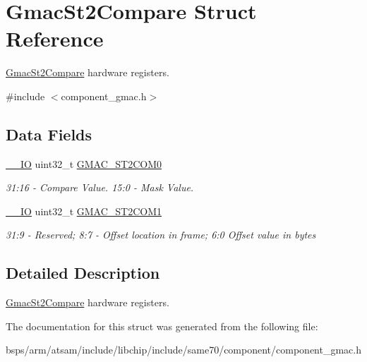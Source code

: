 \hypertarget{structGmacSt2Compare}{}\section{Gmac\+St2\+Compare Struct Reference}
\label{structGmacSt2Compare}


\mbox{\hyperlink{structGmacSt2Compare}{Gmac\+St2\+Compare}} hardware registers.  




{\ttfamily \#include $<$component\+\_\+gmac.\+h$>$}

\subsection*{Data Fields}
\begin{DoxyCompactItemize}
\item 
\mbox{\label{structGmacSt2Compare_a7afa5c123d6a9513fa625e56fb5051a4}} 
\mbox{\hyperlink{core__cm7_8h_aec43007d9998a0a0e01faede4133d6be}{\+\_\+\+\_\+\+IO}} uint32\+\_\+t \mbox{\hyperlink{structGmacSt2Compare_a7afa5c123d6a9513fa625e56fb5051a4}{G\+M\+A\+C\+\_\+\+S\+T2\+C\+O\+M0}}
\begin{DoxyCompactList}\small\item\em 31\+:16 -\/ Compare Value. 15\+:0 -\/ Mask Value. \end{DoxyCompactList}\item 
\mbox{\label{structGmacSt2Compare_a95eff5b32553fe17484b8ba6be25b613}} 
\mbox{\hyperlink{core__cm7_8h_aec43007d9998a0a0e01faede4133d6be}{\+\_\+\+\_\+\+IO}} uint32\+\_\+t \mbox{\hyperlink{structGmacSt2Compare_a95eff5b32553fe17484b8ba6be25b613}{G\+M\+A\+C\+\_\+\+S\+T2\+C\+O\+M1}}
\begin{DoxyCompactList}\small\item\em 31\+:9 -\/ Reserved; 8\+:7 -\/ Offset location in frame; 6\+:0 Offset value in bytes \end{DoxyCompactList}\end{DoxyCompactItemize}


\subsection{Detailed Description}
\mbox{\hyperlink{structGmacSt2Compare}{Gmac\+St2\+Compare}} hardware registers. 

The documentation for this struct was generated from the following file\+:\begin{DoxyCompactItemize}
\item 
bsps/arm/atsam/include/libchip/include/same70/component/component\+\_\+gmac.\+h\end{DoxyCompactItemize}
